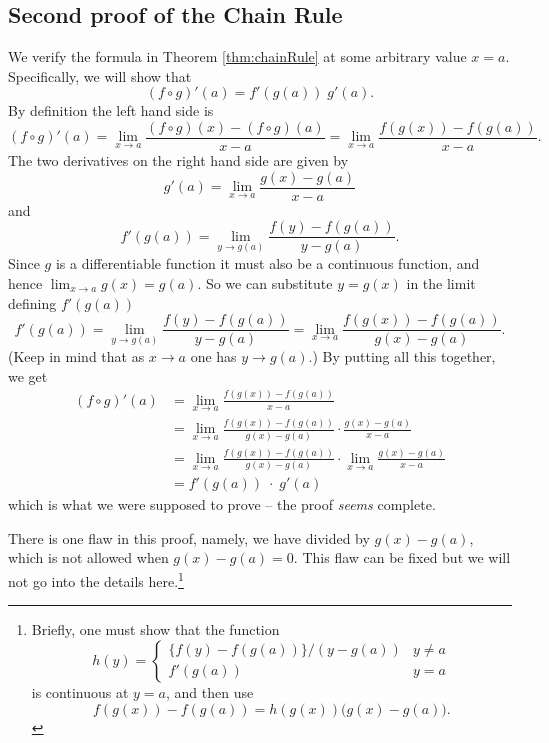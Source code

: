 \subsection{Second proof of the Chain Rule} 
We verify the formula in Theorem \ref{thm:chainRule} at some arbitrary value
$x=a$.  Specifically, we will show that
\[
(f\circ g)'(a) = f'(g(a))\;g'(a).
\]
By definition the left hand side is
\[
(f\circ g)'(a) = \lim_{x\to a}\frac{(f\circ g)(x)-(f\circ g)(a)}{x-a} =
\lim_{x\to a}\frac{f(g(x))-f(g(a))}{x-a}.
\]
The two derivatives on the right hand side are given by
\[
g'(a) = \lim_{x\to a} \frac {g(x)- g(a)}{x-a}
\]
and
\[
f'(g(a)) = \lim_{y\to g(a)} \frac{f(y) - f(g(a))}{y-g(a)}.
\]
Since $g$ is a differentiable function it must also be a continuous function,
and hence $\lim_{x\to a} g(x) = g(a)$.  So we can substitute $y=g(x)$ in the
limit defining $f'(g(a))$
\begin{equation}
  f'(g(a)) = \lim_{y\to g(a)} \frac{f(y) - f(g(a))}{y-g(a)}
  =\lim_{x\to a} \frac{f(g(x))-f(g(a))}{g(x)-g(a)}.  
\end{equation}
(Keep in mind that as $x\to a$ one has $y\to g(a)$.)  By putting all this
together, we get
\begin{align*}
  (f\circ g)'(a)
  &= \lim_{x\to a}\frac{f(g(x))-f(g(a))}{x-a}\\
  &= \lim_{x\to a}
  \frac{f(g(x))-f(g(a))}{g(x)-g(a)}\cdot\frac{g(x)-g(a)}{x-a}\\
  &= \lim_{x\to a} \frac{f(g(x))-f(g(a))}{g(x)-g(a)}
  \cdot\lim_{x\to a}\frac{g(x)-g(a)}{x-a}\\
  &=f'(g(a)) \;\cdot\;g'(a)
\end{align*}
which is what we were supposed to prove -- the proof \textit{seems} complete.




There is one flaw in this proof, namely, we have divided by $g(x)-g(a)$, which
is not allowed when $g(x)-g(a) = 0$.  This flaw can be fixed but we will not go
into the details here.\footnote{ Briefly, one must show that the function
  \[ h(y) =
  \begin{cases} \{f(y)-f(g(a))\}/(y-g(a)) & y\neq a \\ f'(g(a)) & y=a
  \end{cases}
  \] is continuous at $y=a$, and then use
  \[
  f(g(x)) - f(g(a)) = h(g(x)) \bigl(g(x) - g(a)\bigr).
  \]
}








